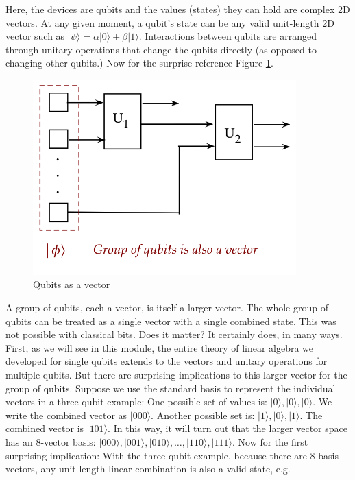 \documentclass[main.tex]{subfiles}
\begin{document}
    Here, the devices are qubits and the values (states) they can hold are complex 2D vectors. At any given moment, a qubit's state can be any valid unit-length 2D vector such as $|\psi\rangle=\alpha|0\rangle+\beta|1\rangle$. Interactions between qubits are arranged through unitary operations that change the qubits directly (as opposed to changing other qubits.) Now for the surprise reference Figure \ref{fig:03bits2b}.
    
    \begin{figure}
        \centering
        \includegraphics[width=4in]{notes/figs/n06/03bits2b.png}
        \caption{Qubits as a vector}
        \label{fig:03bits2b}
    \end{figure} 
    
    A group of qubits, each a vector, is itself a larger vector. The whole group of qubits can be treated as a single vector with a single combined state. This was not possible with classical bits. Does it matter? It certainly does, in many ways. First, as we will see in this module, the entire theory of linear algebra we developed for single qubits extends to the vectors and unitary operations for multiple qubits. But there are surprising implications to this larger vector for the group of qubits. Suppose we use the standard basis to represent the individual vectors in a three qubit example: One possible set of values is: $|0\rangle,|0\rangle,|0\rangle$. We write the combined vector as $|000\rangle$. Another possible set is: $|1\rangle,|0\rangle,|1\rangle$. The combined vector is $|101\rangle$. In this way, it will turn out that the larger vector space has an 8-vector basis: $|000\rangle,|001\rangle,|010\rangle, \ldots,|110\rangle,|111\rangle$. Now for the first surprising implication: With the three-qubit example, because there are 8 basis vectors, any unit-length linear combination is also a valid state, e.g.
    
\end{document}

